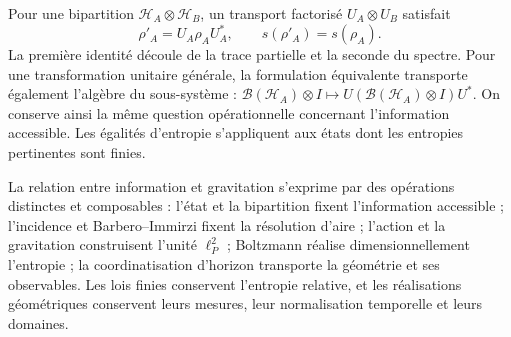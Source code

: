 Pour une bipartition \(\mathcal H_A\otimes\mathcal H_B\), un
transport factorisé \(U_A\otimes U_B\) satisfait
\[
 \rho'_A=U_A\rho_AU_A^*,\qquad s(\rho'_A)=s(\rho_A).
\]
La première identité découle de la trace partielle et la seconde du spectre.
Pour une transformation unitaire générale, la formulation équivalente transporte également
l'algèbre du sous-système :
\(\mathcal B(\mathcal H_A)\otimes I\mapsto
U(\mathcal B(\mathcal H_A)\otimes I)U^*\).
On conserve ainsi la même question opérationnelle concernant l'information
accessible. Les égalités d'entropie s'appliquent aux états dont les entropies
pertinentes sont finies.

La relation entre information et gravitation s'exprime par des opérations distinctes et composables : l'état et la bipartition fixent l'information accessible ; l'incidence et Barbero--Immirzi fixent la résolution d'aire ; l'action et la gravitation construisent l'unité \(\ell_P^2\) ; Boltzmann réalise dimensionnellement l'entropie ; la coordinatisation d'horizon transporte la géométrie et ses observables. Les lois finies conservent l'entropie relative, et les réalisations géométriques conservent leurs mesures, leur normalisation temporelle et leurs domaines.
